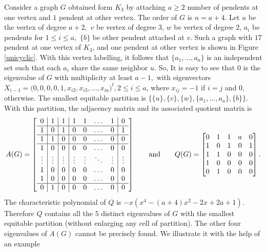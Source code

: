 \documentclass[12pt,twoside]{article}
\begin{document}
Consider a graph  $G$ obtained form $K_{3}$ by attaching $a\geq 2$ number of pendents at one vertex and $1$ pendent at other vertex. The order of $G$ is $n=a+4.$ Let $u$ be the vertex of degree $a+2,$ $v$ be vertex of degree $3$, $w$ be vertex of degree $2$, $a_{i}$ be pendents for $1\leq i\leq a,$ $\{b\}$ be other pendent attached at $v$. Such a graph with $17$ pendent at one vertex of $K_{3}$, and one pendent at other vertex is shown in Figure \ref{unicyclic}.
With this vertex labelling, it follows that $\{a_{1},\dots,a_{a}\}$ is an independent set such that each $a_{i}$ share the same neighbor $u $. So, It is easy to see that  $0$ is the eigenvalue of $G$ with multiplicity at least $a-1,$ with eigenvectors $X_{i-1}=\big(0,0,0,0,1,x_{i2},x_{i3},\dots,x_{ia}\big)^{t}, 2\leq i \leq a$, where $x_{ij}=-1$ if $i=j$ and $0$, otherwise.
 The smallest equitable partition is $\{\{u\},\{v\},\{w\}, \{a_{1},\dots,a_{a}\},\{b\}\}$. With this partition, the adjacency matrix and its associated quotient matrix is 
 $$ A(G)=\left[ \begin{array}{c | c | c | c c c c | c}
	0 & 1 & 1 & 1 & 1 & \dots & 1 & 0 \\
	\hline
	1 & 0 & 1 & 0 & 0 & \dots & 0 & 1\\
	\hline
	1 & 1 & 0 & 0 & 0 &  \dots & 0 & 0\\
	\hline
	1 & 0 & 0 & 0 & 0 & \dots & 0 & 0\\
	\vdots & \vdots & \vdots & \vdots & \vdots & \ddots & \vdots & \vdots \\
	1 & 0 & 0 & 0 & 0 & \dots & 0 & 0\\
	1 & 0 & 0 & 0 & 0 & \dots & 0 & 0\\
	\hline
	0 & 1 & 0 & 0 & 0 & \dots & 0 & 0
\end{array}\right]\qquad \text{and}\qquad Q(G)=\begin{bmatrix}
	0 & 1 & 1 & a & 0\\
	1 & 0 & 1 & 0 & 1\\
	1 & 1 & 0 & 0 & 0\\
	1 & 0 & 0 & 0 & 0\\
	0 & 1 & 0 & 0 & 0
\end{bmatrix}. $$
The characteristic polynomial of $Q$ is $-x \left(x^{4}-(a+4) x^2-2 x+2 a+1\right).$ Therefore $Q$ contains all the $5$ distinct eigenvalues of $G$ with the smallest equitable partition (without enlarging any cell of partition). The other four eigenvalues of $A(G)$ cannot be precisely found. We illustrate it with the help of an example
\end{document}
